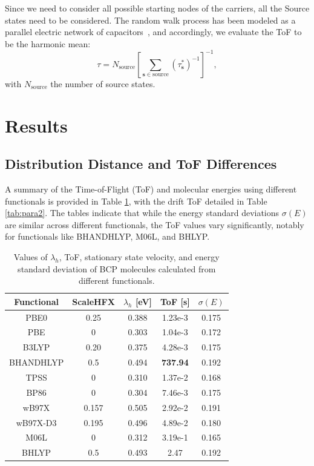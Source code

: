 \documentclass[letterpaper,12pt]{article}
\begin{document}
Since we need to consider all possible starting nodes of the carriers, all the Source states need to be considered. 
The random walk process has been modeled as a parallel electric network of capacitors~\cite{doyle_random_2000}, and accordingly, we evaluate the ToF to be the harmonic mean:
%
\begin{equation}
\tau = N_\text{source} \left[\sum_{\mathbf{s}\in \text{source}} (\tau_\mathbf{s}^\ast)^{-1}\right]^{-1},
\end{equation}
with $N_\text{source}$ the number of source states.

\section{Results}
\label{sec:result}

\subsection{Distribution Distance and ToF Differences}
A summary of the Time-of-Flight (ToF) and molecular energies using different functionals is provided in Table \ref{tab:para}, with the drift ToF detailed in Table \ref{tab:para2}. The tables indicate that while the energy standard deviations $\sigma(E)$ are similar across different functionals, the ToF values vary significantly, notably for functionals like BHANDHLYP, M06L, and BHLYP.

\begin{table}[h]
    \centering
    \begin{tabular}{c c c c c }
    \hline
        Functional & ScaleHFX & $\lambda_h$ [eV] & ToF [s] & $\sigma(E)$ \\ 
        \hline
        PBE0 & 0.25 & 0.388 & 1.23e-3 & 0.175 \\
        PBE & 0 & 0.303 & 1.04e-3 & 0.172 \\ 
        B3LYP & 0.20 & 0.375 & 4.28e-3 & 0.175 \\
        BHANDHLYP & 0.5 & 0.494 & \textbf{737.94} & 0.192 \\
        TPSS & 0 & 0.310 & 1.37e-2 & 0.168 \\
        BP86 & 0 & 0.304 & 7.46e-3 & 0.175 \\
        wB97X & 0.157 & 0.505 & 2.92e-2 & 0.191 \\
        wB97X-D3 & 0.195 & 0.496 & 4.89e-2 & 0.180 \\
        M06L & 0 & 0.312 & 3.19e-1 & 0.165 \\
        BHLYP & 0.5 & 0.493 & 2.47 & 0.192 \\
    \hline
    \end{tabular}
    \caption{Values of $\lambda_h$, ToF, stationary state velocity, and energy standard deviation of BCP molecules calculated from different functionals.}
    \label{tab:para}
\end{table}
\end{document}
